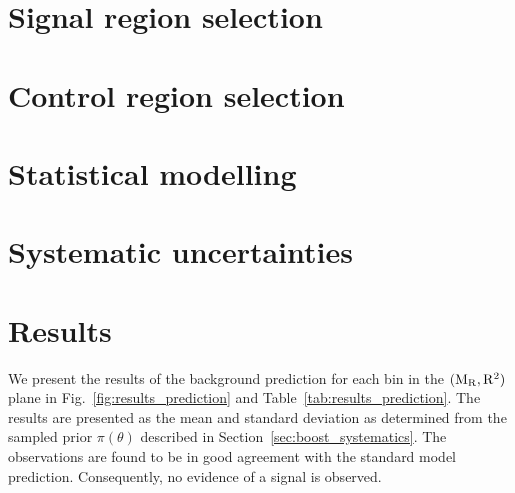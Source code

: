 


\section{Signal region selection \label{sec:boost_signal_selection}}



\section{Control region selection \label{sec:boost_control_selection}}



\section{Statistical modelling \label{sec:boost_likelihood}}




\section{Systematic uncertainties \label{sec:boost_systematics}}


\section{Results \label{sec:boost_results}}

We present the results of the background prediction for each bin in the $(\mathrm{M_R},\mathrm{R^2})$ plane in
Fig.~\ref{fig:results_prediction} and Table~\ref{tab:results_prediction}. The results are presented
as the mean and standard deviation as determined from the sampled prior $\pi(\theta)$
described in Section~\ref{sec:boost_systematics}.  
The observations are found to be in good agreement with the standard model prediction. Consequently,
no evidence of a signal is observed. 

